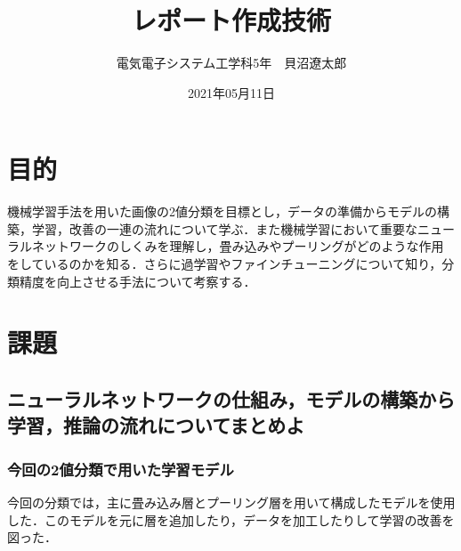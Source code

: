 \documentclass[uplatex,titlepage]{jsarticle}
\title{レポート作成技術}
\author{電気電子システム工学科5年　貝沼遼太郎}
\date{2021年05月11日}
\newif\iffigure
\begin{document}
\maketitle
\section{目的}
機械学習手法を用いた画像の2値分類を目標とし，データの準備からモデルの構築，学習，改善の一連の流れについて学ぶ．また機械学習において重要なニューラルネットワークのしくみを理解し，畳み込みやプーリングがどのような作用をしているのかを知る．さらに過学習やファインチューニングについて知り，分類精度を向上させる手法について考察する．

\section{課題}
\subsection{ニューラルネットワークの仕組み，モデルの構築から学習，推論の流れについてまとめよ}
\subsubsection{今回の2値分類で用いた学習モデル}
今回の分類では，主に畳み込み層とプーリング層を用いて構成したモデルを使用した．このモデルを元に層を追加したり，データを加工したりして学習の改善を図った．
\iffigure
\begin{figure}[H]%
    \begin{center}
    \texttt{[image: IMG\_3641.JPG]} 
    \caption{畳み込み層とプーリング層により構成されたモデル}
    \end{center}
\end{figure}
\fi
\end{document}
